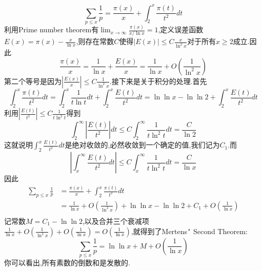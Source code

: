 \documentclass[a4paper,UTF8,12pt]{ctexart}
\begin{document}
$$
\sum_{p\leqslant x}\frac{1}{p} = \frac{\pi(x)}{x} + \int_2^x \frac{\pi(t)}{t^2}dt
$$
利用Prime number theorem\cite{terencetao_zeta}有$\lim_{x \to \infty} \frac{\pi(x)}{x/\ln x} = 1$,定义误差函数$E(x)=\pi(x)-\frac{x}{\ln x}$,则存在常数$C$使得$|E(x)| \leqslant C\frac{x}{\ln^2 x}$对于所有$x\geqslant 2$成立.因此
$$
    \frac{\pi(x)}{x}= \frac{1}{\ln x} + \frac{E(x)}{x}= \frac{1}{\ln x} + O\left(\frac{1}{\ln^2 x}\right)
$$
第二个等号是因为$\left|\frac{E(x)}{x}\right|\leqslant C\frac{1}{\ln^2 x}$.接下来是关于积分的处理.首先
$$
\int_2^x \frac{\pi(t)}{t^2}dt= \int_2^x \frac{1}{t\ln t}dt + \int_2^x \frac{E(t)}{t^2}dt=\ln\ln x-\ln\ln 2 + \int_2^x \frac{E(t)}{t^2}dt
$$
利用$\left|\frac{E(t)}{t^2}\right| \leqslant C\frac{1}{t\ln^2 t}$得到
$$
\int_2^{\infty}\left|\frac{E(t)}{t^2}\right|dt \leqslant C\int_2^{\infty} \frac{1}{t\ln^2 t}dt=\frac{C}{\ln 2}
$$
这就说明$\int_2^x \frac{E(t)}{t^2}dt$是绝对收敛的,必然收敛到一个确定的值,我们记为$C_1$.而
$$
\left|\int_x^{\infty}\frac{E(t)}{t^2}dt\right|\leqslant C\int_x^{\infty} \frac{1}{t\ln^2 t}dt = \frac{C}{\ln x}
$$
因此
$$
\begin{aligned}
    \sum_{p\leqslant x}\frac{1}{p} &= \frac{\pi(x)}{x} + \int_2^x \frac{\pi(t)}{t^2}dt\\
    &= \frac{1}{\ln x} + O\left(\frac{1}{\ln^2 x}\right) + \ln\ln x-\ln\ln 2 + C_1 + O\left(\frac{1}{\ln x}\right) \\
\end{aligned}
$$
记常数$M=C_1-\ln\ln 2$,以及合并三个衰减项$\frac{1}{\ln x}+O\left(\frac{1}{\ln^2 x}\right) + O\left(\frac{1}{\ln x}\right) = O\left(\frac{1}{\ln x}\right)$,就得到了Mertens\texttt{'} Second Theorem:
$$
\sum_{p\leqslant x}\frac{1}{p} = \ln\ln x + M + O\left(\frac{1}{\ln x}\right)
$$
你可以看出,所有素数的倒数和是发散的.




\printbibliography
\end{document}
